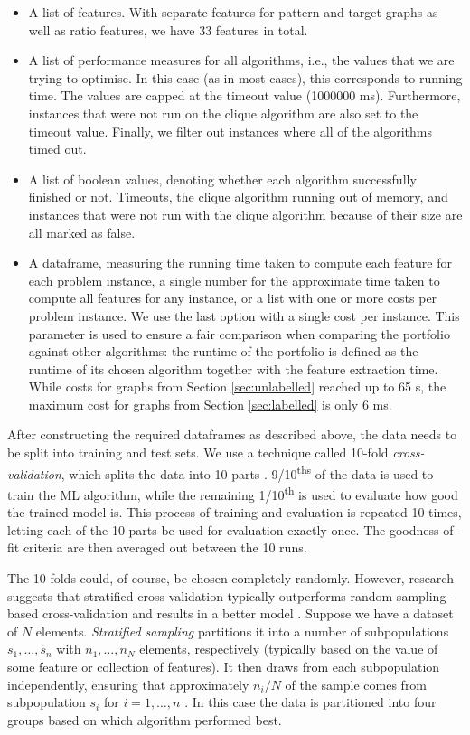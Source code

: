 \documentclass{l4proj}
\theoremstyle{definition}
\theoremstyle{remark}
\begin{document}
\begin{itemize}
\item A list of features. With separate features for pattern and target graphs
  as well as ratio features, we have 33 features in total.
\item A list of performance measures for all algorithms, i.e., the values that
  we are trying to optimise. In this case (as in most cases), this corresponds
  to running time. The values are capped at the timeout value (\num{1000000} ms).
  Furthermore, instances that were not run on the clique algorithm are also set
  to the timeout value. Finally, we filter out instances where all of the
  algorithms timed out.
\item A list of boolean values, denoting whether each algorithm successfully
  finished or not. Timeouts, the clique algorithm running out of memory, and
  instances that were not run with the clique algorithm because of their size
  are all marked as false.
\item A dataframe, measuring the running time taken to compute each feature for
  each problem instance, a single number for the approximate time taken to
  compute all features for any instance, or a list with one or more costs per
  problem instance. We use the last option with a single cost per instance. This
  parameter is used to ensure a fair comparison when comparing the portfolio
  against other algorithms: the runtime of the portfolio is defined as the
  runtime of its chosen algorithm together with the feature extraction time.
  While costs for graphs from Section \ref{sec:unlabelled} reached up to 65 s,
  the maximum cost for graphs from Section \ref{sec:labelled} is only 6 ms.
\end{itemize}

After constructing the required dataframes as described above, the data needs to
be split into training and test sets. We use a technique called 10-fold
\emph{cross-validation}, which splits the data into 10 parts \cite{citeulike:1304145}.
9/10\textsuperscript{ths} of the data is used to train the ML algorithm, while
the remaining 1/10\textsuperscript{th} is used to evaluate how good the trained
model is. This process of training and evaluation is repeated 10 times, letting
each of the 10 parts be used for evaluation exactly once. The goodness-of-fit
criteria are then averaged out between the 10 runs.

The 10 folds could, of course, be chosen completely randomly. However, research
suggests that stratified cross-validation typically outperforms
random-sampling-based cross-validation and results in a better model
\cite{DBLP:conf/ijcai/Kohavi95}. Suppose we have a dataset of $N$ elements.
\emph{Stratified sampling} partitions it into a number of subpopulations $s_1,
\dots, s_n$ with $n_1, \dots, n_N$ elements, respectively (typically based on
the value of some feature or collection of features). It then draws from each
subpopulation independently, ensuring that approximately $n_i/N$ of the sample
comes from subpopulation $s_i$ for $i = 1, \dots, n$ \cite{lohr2009sampling}. In
this case the data is partitioned into four groups based on which algorithm
performed best.
\end{document}
